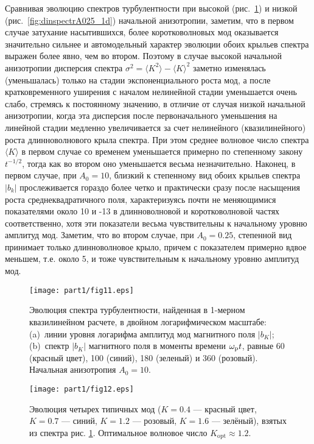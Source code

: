Сравнивая эволюцию спектров турбулентности при высокой (рис.~\ref{fig:dinspectrA10_1d}) и низкой (рис.~\ref{fig:dinspectrA025_1d}) начальной анизотропии, заметим, что в первом случае затухание насытившихся, более коротковолновых мод оказывается значительно сильнее и автомодельный характер эволюции обоих крыльев спектра выражен более явно, чем во втором. Поэтому в случае высокой начальной анизотропии дисперсия спектра $\sigma^2=\langle K^2\rangle-\langle K\rangle^2$ заметно изменялась (уменьшалась) только на стадии экспоненциального роста мод, а после кратковременного уширения с началом нелинейной стадии уменьшается очень слабо, стремясь к постоянному значению, в отличие от случая низкой начальной анизотропии, когда эта дисперсия после первоначального уменьшения на линейной стадии медленно увеличивается за счет нелинейного (квазилинейного) роста длинноволнового крыла спектра. При этом среднее волновое число спектра $\langle K\rangle$ в первом случае со временем уменьшается примерно по степенному закону $t^{-1/2}$, тогда как во втором оно уменьшается весьма незначительно. Наконец, в первом случае, при $A_0=10$, близкий к степенному вид обоих крыльев спектра $|b_{k}|$ прослеживается гораздо более четко и практически сразу после насыщения роста среднеквадратичного поля, характеризуясь почти не меняющимися показателями около 10 и -13 в длинноволновой и коротковолновой частях соответственно, хотя эти показатели весьма чувствительны к начальному уровню амплитуд мод. Заметим, что во втором случае, при $A_0=0.25$, степенной вид принимает только длинноволновое крыло, причем с показателем примерно вдвое меньшем, т.е. около 5, и тоже чувствительным к начальному уровню амплитуд мод.
\begin{figure}[t]
\centering
\texttt{[image: part1/fig11.eps]}
\caption{Эволюция спектра турбулентности, найденная в 1-мерном квазилинейном расчете, в двойном логарифмическом масштабе: (a)~линии уровня логарифма амплитуд мод магнитного поля $|b_K|$; (b)~спектр $|b_K|$ магнитного поля в моменты времени $\omega_\mathrm{p} t$, равные 60 (красный цвет), 100 (синий), 180 (зеленый) и 360 (розовый). Начальная анизотропия $A_0=10$.}
\label{fig:dinspectrA10_1d}
\end{figure}

\begin{figure}[b]
\centering
\texttt{[image: part1/fig12.eps]}
\caption{Эволюция четырех типичных мод ($K=0.4$ --- красный цвет, $K=0.7$ --- синий, $K=1.2$ --- розовый, $K=1.6$ --- зелёный), взятых из спектра рис. \ref{fig:dinspectrA10_1d}. Оптимальное волновое число $K_\mathrm{opt}\approx1.2$.}
\label{fig:evol_garmA010_1d}
\end{figure}

